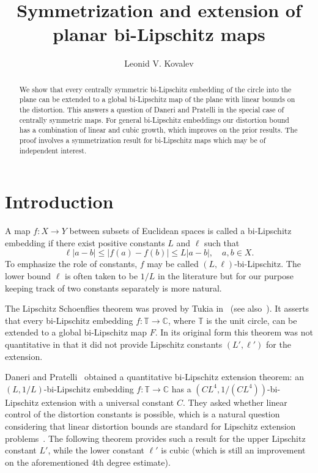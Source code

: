 \documentclass[11pt]{amsart}
\title{Symmetrization and extension of planar bi-Lipschitz maps}
\author{Leonid V. Kovalev}
\theoremstyle{remark}
\numberwithin{equation}{section}
\newcommand{\C}{\mathbb{C}}
\newcommand{\T}{\mathbb{T}}
\newcommand{\abs}[1]{\lvert#1\rvert}
\begin{document}
\begin{abstract} We show that every centrally symmetric bi-Lipschitz embedding of the circle into the plane
can be extended to a global bi-Lipschitz map of the plane with linear bounds on the distortion. This answers a 
question of Daneri and Pratelli in the special case of centrally symmetric maps. For general bi-Lipschitz embeddings our distortion bound has a combination of linear and cubic growth, which improves on the prior results. The proof involves a symmetrization result for bi-Lipschitz maps which may be of independent interest. 
\end{abstract}

\maketitle

\section{Introduction}

A map $f\colon X\to Y$ between subsets of Euclidean spaces is called a bi-Lipschitz embedding if there exist positive constants $L$ and $\ell$ such that 
\begin{equation}\label{BLdef}
\ell\abs{a-b}\le \abs{f(a)-f(b)}\le L\abs{a-b}, \quad a,b\in X.
\end{equation}
To emphasize the role of constants, $f$ may be called  $(L, \ell)$-bi-Lipschitz. The lower bound $\ell$ is often taken to be $1/L$ in the literature but for our purpose keeping track of two  constants separately is more natural.  

The Lipschitz Schoenflies theorem was proved by Tukia in~\cite{Tu, Tu2} (see also~\cite{JK,Lat2}). It asserts that every bi-Lipschitz embedding $f\colon \T\to\C$, where $\T$ is the unit circle, can be extended to a global bi-Lipschitz map $F$. In its original form this theorem was not quantitative in that it did not provide Lipschitz constants $(L', \ell')$ for the extension.      

Daneri and Pratelli~\cite{DP} obtained a quantitative bi-Lipschitz extension theorem: an $(L, 1/L)$-bi-Lipschitz embedding $f\colon \T\to\C$ has a $(CL^4, 1/(CL^4))$-bi-Lipschitz extension with a universal constant $C$. They asked whether linear control of the distortion constants is possible, which is a natural question considering that linear distortion bounds are standard for Lipschitz extension problems~\cite{BB}. The following theorem provides such a result for the upper Lipschitz constant $L'$, while the lower constant $\ell'$ is cubic (which is still an improvement on the aforementioned $4$th degree estimate). 
\end{document}
